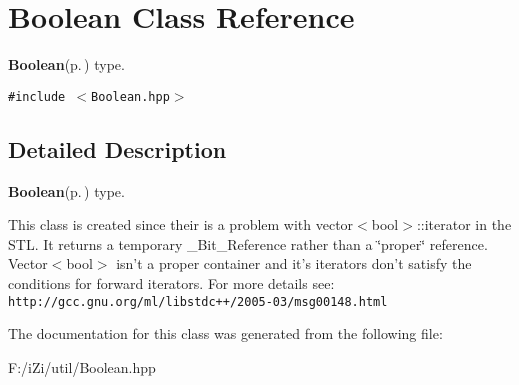 \section{Boolean Class Reference}
\label{class_boolean}
{\bf Boolean}{\rm (p.\,\pageref{class_boolean})} type.  


{\tt \#include $<$Boolean.hpp$>$}



\subsection{Detailed Description}
{\bf Boolean}{\rm (p.\,\pageref{class_boolean})} type. 

This class is created since their is a problem with vector$<$bool$>$::iterator in the STL. It returns a temporary \_\-Bit\_\-Reference rather than a \char`\"{}proper\char`\"{} reference. Vector$<$bool$>$ isn't a proper container and it's iterators don't satisfy the conditions for forward iterators. For more details see: {\tt http://gcc.gnu.org/ml/libstdc++/2005-03/msg00148.html} 



The documentation for this class was generated from the following file:\begin{CompactItemize}
\item 
F:/i\-Zi/util/Boolean.hpp\end{CompactItemize}

